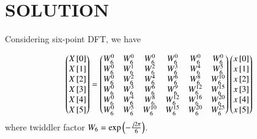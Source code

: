 \documentclass[journal,12pt,twocolumn]{IEEEtran}
\begin{document}
\section*{SOLUTION}
Considering six-point DFT, we have 

\begin{align}
\label{eq:1}
\begin{pmatrix}X{}\left[0\right]\\X{}\left[1\right]\\X{}\left[2\right]\\X{}\left[3\right]\\X{}\left[4\right]\\X{}\left[5\right]\end{pmatrix} = \begin{pmatrix}W_{6}^{0}&W_{6}^{0}&W_{6}^{0}&W_{6}^{0}&W_{6}^{0}&W_{6}^{0}\\W_{6}^{0}&W_{6}^{1}&W_{6}^{2}&W_{6}^{3}&W_{6}^{4}&W_{6}^{5}\\W_{6}^{0}&W_{6}^{2}&W_{6}^{4}&W_{6}^{6}&W_{6}^{8}&W_{6}^{10}\\W_{6}^{0}&W_{6}^{3}&W_{6}^{6}&W_{6}^{9}&W_{6}^{12}&W_{6}^{15}\\W_{6}^{0}&W_{6}^{4}&W_{6}^{8}&W_{6}^{12}&W_{6}^{16}&W_{6}^{20}\\W_{6}^{0}&W_{6}^{5}&W_{6}^{10}&W_{6}^{15}&W_{6}^{20}&W_{6}^{25}\end{pmatrix}\begin{pmatrix}x{}\left[0\right]\\x{}\left[1\right]\\x{}\left[2\right]\\x{}\left[3\right]\\x{}\left[4\right]\\x{}\left[5\right]\end{pmatrix}
\end{align}
where twiddler factor $W_{6} = \text{exp}\left(-\frac{j2\pi}{6}\right)$.
\end{document}
